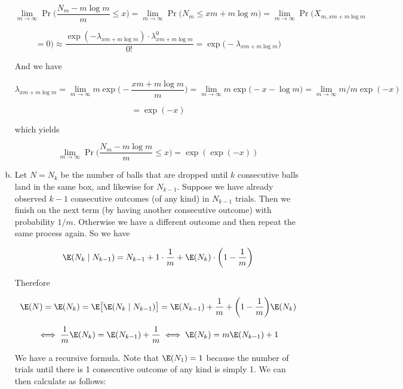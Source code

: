 \begin{enumerate}[(a)]
\[
\lim_{m \to \infty} \Pr \bigg( \frac{N_m - m \log m}{m} \leq x \bigg) = \lim_{m \to \infty} \Pr \big( N_m \leq xm + m \log    m\big) = \lim_{m \to \infty} \Pr \big( X_{m, {xm + m \log    m}} 
\]

\[
= 0) \approx \frac{\exp(-\lambda_ {xm + m \log    m}) \cdot \lambda_ {xm + m \log    m}^0}{0!} = \exp \big(-\lambda_ {xm + m \log    m} \big)
\]



And we have

\[
\lambda_ {xm + m \log    m} = \lim_{m \to \infty} m \exp \bigg(-\frac{xm + m \log    m}{m} \bigg) = \lim_{m \to \infty} m \exp \big(-x -  \log    m\big)   = \lim_{m \to \infty} m/m \exp (-x ) 
\]



\[
 = \exp(-x)
\]

which yields

\[
\boxed{
\lim_{m \to \infty} \Pr \bigg( \frac{N_m - m \log m}{m} \leq x \bigg)  = \exp( \exp(-x))}
\]





\item Let \(N = N_k\) be the number of balls that are dropped until \(k\) consecutive balls land in the same box, and likewise for \(N_{k-1}\). Suppose we have already observed \(k-1\) consecutive outcomes (of any kind) in \(N_{k-1} \) trials. Then we finish on the next term (by having another consecutive outcome) with probability \(1/m\). Otherwise we have a different outcome and then repeat the same process again. So we have

\[
\E(N_k \mid N_{k-1} ) = N_{k-1} + 1 \cdot \frac{1}{m} + \E(N_k) \cdot \bigg(1 - \frac{1}{m} \bigg)
\]

Therefore

\[
\E(N) = \E(N_k) = \E \big[ \E(N_k \mid N_{k-1} )\big] = \E(N_{k-1}) + \frac{1}{m} + \bigg(1 - \frac{1}{m} \bigg) \E(N_k)
\]

\[
\iff \frac{1}{m} \E(N_k) = \E(N_{k-1}) + \frac{1}{m} \iff \E(N_k) = m \E(N_{k-1}) + 1
\]

We have a recursive formula. Note that \(\E(N_1) = 1\) because the number of trials until there is 1 consecutive outcome of any kind is simply 1. We can then calculate as follows:


\end{enumerate}
